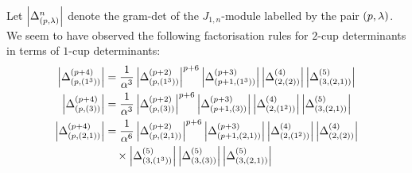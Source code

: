 {Let $\left|\Delta^{n}_{(p,\lambda)}\right|$ denote the gram-det of the $J_{1,n}$-module labelled by the pair $(p,\lambda)$. We seem to have  observed the following factorisation rules for $2$-cup determinants in terms of $1$-cup determinants:
\begin{align*}
 \left|\Delta_{(p,(1^3))}^{(p+4)}\right|&=\frac{1}{\alpha^3}
    \left|\Delta_{(p,(1^3))}^{(p+2)}\right|^{p+6}
    \left|\Delta_{(p+1,(1^3))}^{(p+3)}\right|
    \left|\Delta_{(2,(2))}^{(4)}\right|
    \left|\Delta_{(3,(2,1))}^{(5)}\right|\\
 \left|\Delta_{(p,(3))}^{(p+4)}\right|&=\frac{1}{\alpha^3}
    \left|\Delta_{(p,(3))}^{(p+2)}\right|^{p+6}
    \left|\Delta_{(p+1,(3))}^{(p+3)}\right|
    \left|\Delta_{(2,(1^2))}^{(4)}\right|
    \left|\Delta_{(3,(2,1))}^{(5)}\right|\\
 \left|\Delta_{(p,(2,1))}^{(p+4)}\right|&=\frac{1}{\alpha^6}
    \left|\Delta_{(p,(2,1))}^{(p+2)}\right|^{p+6}
    \left|\Delta_{(p+1,(2,1))}^{(p+3)}\right|
    \left|\Delta_{(2,(1^2))}^{(4)}\right|\left|\Delta_{(2,(2))}^{(4)}\right|\\
    &\quad \times\left|\Delta_{(3,(1^3))}^{(5)}\right|\left|\Delta_{(3,(3))}^{(5)}\right|   
    \left|\Delta_{(3,(2,1))}^{(5)}\right|\\
\end{align*}

\bajm{[to here ***]}}

